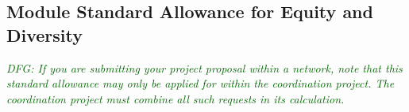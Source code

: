 \documentclass[a4paper,11pt]{amsart}
\theoremstyle{definition}
\newcommand{\<}{\langle}
\renewcommand{\>}{\rangle}
\newcommand{\dfg}[1]{\emph{\textcolor{darkgreen}{DFG: #1}}}
\begin{document}
\subsection{Module Standard Allowance for Equity and Diversity}
\dfg{If you are submitting your project proposal within a network,
  note that this standard allowance may only be applied for within the
  coordination project. The coordination project must combine all such
  requests in its calculation.}
\end{document}
